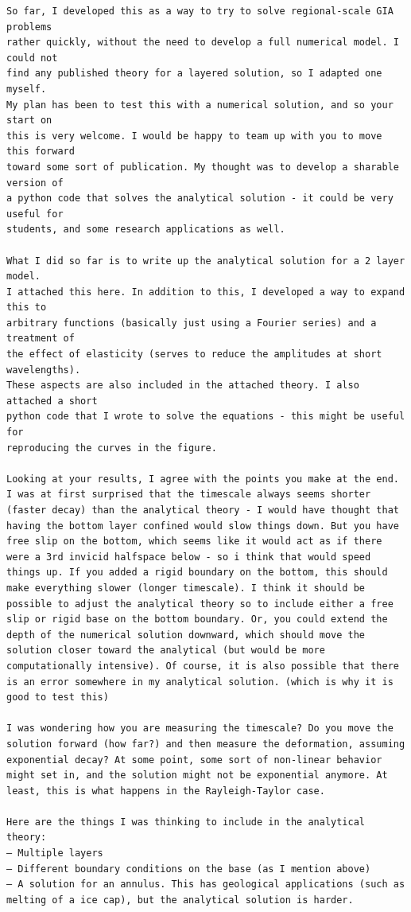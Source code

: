 \begin{verbatim}
So far, I developed this as a way to try to solve regional-scale GIA problems 
rather quickly, without the need to develop a full numerical model. I could not 
find any published theory for a layered solution, so I adapted one myself. 
My plan has been to test this with a numerical solution, and so your start on 
this is very welcome. I would be happy to team up with you to move this forward 
toward some sort of publication. My thought was to develop a sharable version of 
a python code that solves the analytical solution - it could be very useful for 
students, and some research applications as well.

What I did so far is to write up the analytical solution for a 2 layer model. 
I attached this here. In addition to this, I developed a way to expand this to 
arbitrary functions (basically just using a Fourier series) and a treatment of 
the effect of elasticity (serves to reduce the amplitudes at short wavelengths). 
These aspects are also included in the attached theory. I also attached a short 
python code that I wrote to solve the equations - this might be useful for 
reproducing the curves in the figure.

Looking at your results, I agree with the points you make at the end. I was at first surprised that the timescale always seems shorter (faster decay) than the analytical theory - I would have thought that having the bottom layer confined would slow things down. But you have free slip on the bottom, which seems like it would act as if there were a 3rd invicid halfspace below - so i think that would speed things up. If you added a rigid boundary on the bottom, this should make everything slower (longer timescale). I think it should be possible to adjust the analytical theory so to include either a free slip or rigid base on the bottom boundary. Or, you could extend the depth of the numerical solution downward, which should move the solution closer toward the analytical (but would be more computationally intensive). Of course, it is also possible that there is an error somewhere in my analytical solution. (which is why it is good to test this)

I was wondering how you are measuring the timescale? Do you move the solution forward (how far?) and then measure the deformation, assuming exponential decay? At some point, some sort of non-linear behavior might set in, and the solution might not be exponential anymore. At least, this is what happens in the Rayleigh-Taylor case.

Here are the things I was thinking to include in the analytical theory:
— Multiple layers
— Different boundary conditions on the base (as I mention above)
— A solution for an annulus. This has geological applications (such as melting of a ice cap), but the analytical solution is harder.


\end{verbatim}
